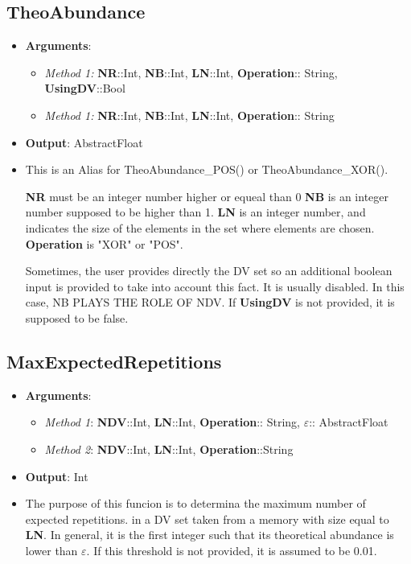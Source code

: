 \subsection*{TheoAbundance}
%
	\begin{itemize}
	\item \textbf{Arguments}:
		\begin{itemize}
			\item \textit{Method 1:} \textbf{NR}::Int, \textbf{NB}::Int, \textbf{LN}::Int, \textbf{Operation}:: String, \textbf{UsingDV}::Bool
			\item \textit{Method 1:} \textbf{NR}::Int, \textbf{NB}::Int, \textbf{LN}::Int, \textbf{Operation}:: String
		\end{itemize}
	\item \textbf{Output}: AbstractFloat
	\item This is an Alias for TheoAbundance\_POS() or TheoAbundance\_XOR().
	
	 \textbf{NR} must be an integer number higher or equeal than 0
	 \textbf{NB} is an integer number supposed to be higher than 1.
	 \textbf{LN} is an integer number, and indicates the size of the elements in the set
	 where elements are chosen.
	 \textbf{Operation} is "XOR" or "POS". 
	 
	   Sometimes, the user provides directly the DV set so an additional boolean
	 input is provided to take into account this fact. It is usually disabled. In this
	 case, NB PLAYS THE ROLE OF NDV. If \textbf{UsingDV} is not provided, it is supposed to be false.
\end{itemize}
%
\subsection*{MaxExpectedRepetitions}
%
\begin{itemize}
	\item \textbf{Arguments}: 
		\begin{itemize}
			\item \textit{Method 1}: \textbf{NDV}::Int, \textbf{LN}::Int, \textbf{Operation}:: String, \(\varepsilon\):: AbstractFloat	
			\item \textit{Method 2}: \textbf{NDV}::Int, \textbf{LN}::Int, \textbf{Operation}::String
		\end{itemize}
	\item \textbf{Output}: Int
	\item The purpose of this funcion is to determina the maximum number of expected
	repetitions. in a DV set taken from a memory with size equal to \textbf{LN}.
	In general, it is the first integer such that its theoretical abundance is
	lower than \(\varepsilon\). If this threshold is not provided, it is assumed to be 0.01.
\end{itemize}
%
